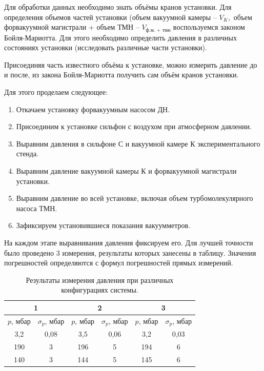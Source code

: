 \documentclass[a4paper, 12pt]{article} %
\begin{document}
Для обработки данных необходимо знать объёмы кранов установки. 
Для определения объемов частей установки (объем вакуумной камеры -- $V_{K},$  объем форвакуумной магистрали + объем ТМН -- $V_{\text{ф.м. + тмн}}$ воспользуемся законом Бойля-Мариотта. Для этого необходимо определить давления в различных состояниях установки (исследовать различные части установки).

Присоединяя часть известного объёма к установке, можно измерить давление до и после, из закона Бойля-Мариотта получить сам объём кранов установки.

Для этого проделаем следующее:
\begin{enumerate}
    \item Откачаем установку форвакуумным насосом ДН.
    \item Присоединим к установке сильфон с воздухом при атмосферном давлении.
    \item Выравним давления в сильфоне С и вакуумной камере К экспериментального стенда.
    \item Выравним давление вакуумной камеры К и форвакуумной магистрали установки.
    \item Выравним давление во всей установке, включая объем турбомолекулярного насоса ТМН.
    \item Зафиксируем установившиеся показания вакуумметров.
    
\end{enumerate}
    
На каждом этапе выравнивания давления фиксируем его. Для лучшей точности было проведено 3 измерения, результаты которых занесены в таблицу. Значения погрешностей определяются с формул погрешностей прямых измерений.

\begin{table}[h]
    \begin{center}
        \begin{tabular}{|c|c|c|c|c|c|}
        \hline
        \multicolumn{2}{|c|}{1} & \multicolumn{2}{c|}{2} & \multicolumn{2}{c|}{3} \\ \hline
        $p$, мбар  & $\sigma_{p}$, мбар & $p$, мбар & $\sigma_{p}$, мбар & $p$, мбар & $\sigma_{p}$, мбар \\ \hline
        3,2     & 0,08         & 3,5    & 0,06         & 3,2 & 0,03         \\ \hline
        190      & 3            & 196     & 5            & 194     & 6            \\ \hline
        140      & 3            & 144     & 5            & 145     & 6            \\ \hline
        \end{tabular}
        \caption{Результаты измерения давления при различных конфигурациях системы.}
    \end{center}
\end{table}
\end{document}
